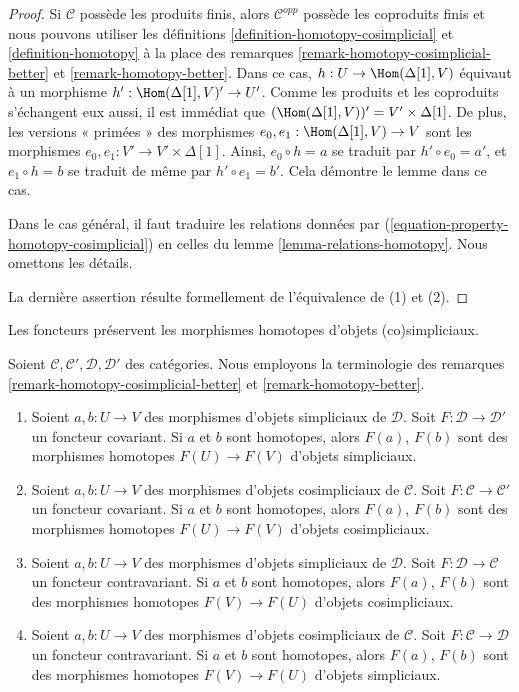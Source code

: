 \begin{proof}
Si $\mathcal{C}$ possède les produits finis, alors $\mathcal{C}^{opp}$
possède les coproduits finis et nous pouvons utiliser les
définitions \ref{definition-homotopy-cosimplicial}
et \ref{definition-homotopy} à la place des
remarques \ref{remark-homotopy-cosimplicial-better} et
\ref{remark-homotopy-better}.
Dans ce cas, $h : U \to \Hom(\Delta[1], V)$ équivaut à un morphisme
$h' : \Hom(\Delta[1], V)' \to U'$.
Comme les produits et les coproduits s'échangent eux aussi, il est immédiat
que $(\Hom(\Delta[1], V))' = V' \times \Delta[1]$.
De plus, les versions « primées » des morphismes
$e_0, e_1 : \Hom(\Delta[1], V) \to V$ sont les morphismes
$e_0, e_1 : V' \to V' \times \Delta[1]$.
Ainsi, $e_0 \circ h = a$ se traduit par $h' \circ e_0 = a'$, et
$e_1 \circ h = b$ se traduit de même par $h' \circ e_1 = b'$.
Cela démontre le lemme dans ce cas.

\medskip\noindent
Dans le cas général, il faut traduire les relations données par
(\ref{equation-property-homotopy-cosimplicial}) en celles du
lemme \ref{lemma-relations-homotopy}. Nous omettons les détails.

\medskip\noindent
La dernière assertion résulte formellement de l'équivalence de (1) et (2).
\end{proof}

\begin{lemma}
\label{lemma-functorial-homotopy}
\begin{slogan}
Les foncteurs préservent les morphismes homotopes d'objets (co)simpliciaux.
\end{slogan}
Soient $\mathcal{C}, \mathcal{C}', \mathcal{D}, \mathcal{D}'$ des catégories.
Nous employons la terminologie des remarques
\ref{remark-homotopy-cosimplicial-better} et \ref{remark-homotopy-better}.
\begin{enumerate}
\item Soient $a, b : U \to V$ des morphismes d'objets simpliciaux
de $\mathcal{D}$. Soit $F : \mathcal{D} \to \mathcal{D}'$ un foncteur
covariant. Si $a$ et $b$ sont homotopes, alors $F(a)$, $F(b)$ sont des
morphismes homotopes $F(U) \to F(V)$ d'objets simpliciaux.
\item Soient $a, b : U \to V$ des morphismes d'objets cosimpliciaux
de $\mathcal{C}$. Soit $F : \mathcal{C} \to \mathcal{C}'$ un foncteur
covariant. Si $a$ et $b$ sont homotopes, alors $F(a)$, $F(b)$ sont des
morphismes homotopes $F(U) \to F(V)$ d'objets cosimpliciaux.
\item Soient $a, b : U \to V$ des morphismes d'objets simpliciaux de $\mathcal{D}$.
Soit $F : \mathcal{D} \to \mathcal{C}$ un foncteur contravariant.
Si $a$ et $b$ sont homotopes, alors $F(a)$, $F(b)$ sont des morphismes
homotopes $F(V) \to F(U)$ d'objets cosimpliciaux.
\item Soient $a, b : U \to V$ des morphismes d'objets cosimpliciaux de
$\mathcal{C}$. Soit $F : \mathcal{C} \to \mathcal{D}$ un foncteur
contravariant. Si $a$ et $b$ sont homotopes, alors $F(a)$, $F(b)$ sont des
morphismes homotopes $F(V) \to F(U)$ d'objets simpliciaux.
\end{enumerate}
\end{lemma}

